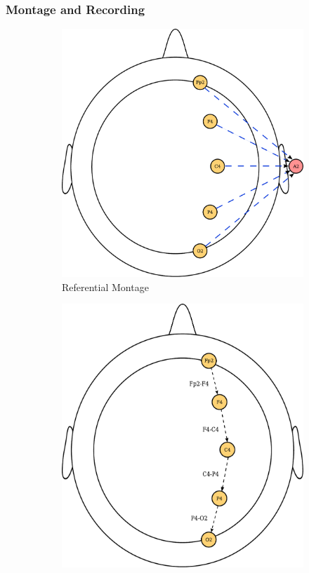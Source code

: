 \documentclass[12pt]{article}
\newcommand\mysubsubsection[1]{\subsubsection{#1}}
\numberwithin{equation}{section}
\numberwithin{figure}{section}
\numberwithin{table}{section}
\begin{document}
\mysubsubsection{Montage and Recording}
\begin{figure}
    \centering
    \begin{subfigure}{.5\textwidth}
        \centering
        \includegraphics[scale=0.4]{images/unipolar_eeg}
        \caption{Referential Montage}
        \label{fig:referential_eeg}
    \end{subfigure}%
    \begin{subfigure}{.5\textwidth}
        \centering
        \includegraphics[scale=0.4]{images/bipolar_eeg}

\end{subfigure}
\end{figure}
\end{document}
